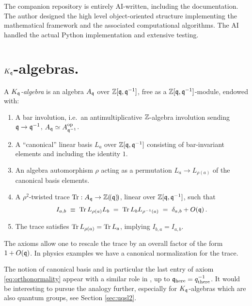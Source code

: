 \documentclass[12pt]{amsart}
\begin{document}
The companion repository is entirely AI-written, including the documentation. The author designed the high level object-oriented structure implementing the mathematical framework 
and the associated computational algorithms. The AI handled the actual Python implementation and extensive testing.  
\newpage
\section{$K_\fq$-algebras.} \label{sec:kq}
\begin{definition}[$K_\fq$-algebra]
\label{def:kq}
A \emph{$K_\fq$-algebra} is an algebra $A_{\mathfrak{q}}$ over $\mathbb{Z}[\mathfrak{q}, \mathfrak{q}^{-1}]$, free
as a $\mathbb{Z}[\mathfrak{q}, \mathfrak{q}^{-1}]$-module, endowed with:
\begin{enumerate}[label=(K\arabic*), ref=K\arabic*, leftmargin=*, itemsep=5pt]
  \item\label{ax:bar}
    A bar involution, i.e.\ an antimultiplicative $\mathbb{Z}$-algebra involution
    sending $\mathfrak{q} \to \mathfrak{q}^{-1}$, $A_{\mathfrak{q}} \simeq A^{\mathrm{op}}_{\mathfrak{q}^{-1}}$.
  \item\label{ax:basis}
    A ``canonical'' linear basis $L_a$ over $\mathbb{Z}[\mathfrak{q}, \mathfrak{q}^{-1}]$ consisting of
    bar-invariant elements and including the identity $1$.
  \item\label{ax:rho}
    An algebra automorphism $\rho$ acting as a permutation
    $L_a \to L_{\rho(a)}$ of the canonical basis elements.
  \item\label{ax:trace}
    A $\rho^2$-twisted trace $\operatorname{Tr} : A_{\mathfrak{q}} \to \mathbb{Z}(\!(\mathfrak{q})\!)$, linear over
    $\mathbb{Z}[\mathfrak{q}, \mathfrak{q}^{-1}]$, such that
    \begin{equation}\label{eq:orthonormality}
      I_{a,b} \;\equiv\; \operatorname{Tr} L_{\rho(a)} L_b \;=\; \operatorname{Tr} L_{b} L_{\rho^{-1}(a)}
      \;=\; \delta_{a,b} + O(\mathfrak{q})\,.
    \end{equation}
   \item\label{ax:rhotr}
   The trace satisfies $\operatorname{Tr} L_{\rho(a)} = \operatorname{Tr} L_a$, implying $I_{b,a} = I_{a,b}$. 
\end{enumerate}
\end{definition}

\begin{remark} The axioms allow one to rescale the trace by an overall factor of the
form $1 + O(\mathfrak{q})$. In physics examples we have a canonical normalization for the
trace. \end{remark}

\begin{remark} The notion of canonical basis and in particular the last entry of axiom \ref{eq:orthonormality} appear with a similar role in \cite{Webster_2014}, up to $\mathfrak{q}_{\mathrm{here}} = q^{-1}_{\mathrm{there}}$.
It would be interesting to pursue the analogy further, especially for $K_\fq$-algebras which are also quantum groups, see Section \ref{sec:uqsl2}. \end{remark}
\end{document}
